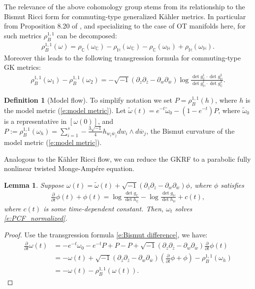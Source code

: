 \documentclass[12pt]{amsart}
\numberwithin{equation}{section}
\newtheorem{lemma}[prop]{Lemma}
\numberwithin{prop}{section}
\theoremstyle{definition}
\newtheorem{defn}[prop]{Definition}
\newcommand{\til}[1]{\widetilde{#1}}
\renewcommand{\bar}[1]{\overline{#1}}
\begin{document}
The relevance of the above cohomology group stems from its relationship to the Bismut Ricci form for commuting-type generalized K\"ahler metrics.  In particular from Proposition 8.20 of \cite{GRFbook}, and specializing to the case of OT manifolds here, for such metrics $\rho_B^{1,1}$ can be decomposed: 
\begin{align}\label{e:bismut ricci 1,1 decomposition}
    \rho_B^{1,1}(\omega) = \rho_\mathbb{C}(\omega_\mathbb{C}) - \rho_\mathbb{H}(\omega_\mathbb{C})-\rho_\mathbb{C}(\omega_\mathbb{H})+\rho_\mathbb{H}(\omega_\mathbb{H}).
\end{align}
Moreover this leads to the following transgression formula for commuting-type GK metrics:
\begin{align}\label{e:Bismut difference}
    \rho_B^{1,1}(\omega_1)-\rho_B^{1,1}(\omega_2) = -\sqrt{-1}(\partial_z\partial_{\bar{z}} - \partial_w\partial_{\bar{w}})\log\frac{\det g^1_\mathbb{C}\cdot\det g^2_\mathbb{H}}{\det g^1_\mathbb{H}\cdot\det g^2_\mathbb{C}}.
\end{align}

\begin{defn}[Model flow] To simplify notation we set $P = \rho_B^{1,1}(h)$, where $h$ is the model metric (\ref{e:model metric}).  Let $\til{\omega}(t)=e^{-t}\til{\omega}_0 -(1-e^{-t})P$, where $\til{\omega}_0$ is a representative in $[\omega(0)]$, and $P:=\rho_B^{1,1}(\omega_h)=\sum_{i=1}^s-\frac{3\sqrt{-1}}{4}h_{w_i\bar{w}_j}dw_i\wedge d\bar{w}_j$, the Bismut curvature of the model metric (\ref{e:model metric}).
\end{defn}
Analogous to the K\"ahler Ricci flow, we can reduce the GKRF to a parabolic fully nonlinear twisted Monge-Amp\'ere equation.
\begin{lemma} \label{l:scalar_reduction}
    Suppose $\omega(t)=\til{\omega}(t)+\sqrt{-1}(\partial_z\partial_{\bar{z}}-\partial_w\partial_{\bar{w}})\phi$, where $\phi$ satisfies
    \begin{align}\label{e:potential eq}
      \frac{\partial}{\partial t}\phi(t)+\phi(t)=\operatorname{log}\frac{\operatorname{det}g_\mathbb{C}}{\operatorname{det}h_\mathbb{C}}-\operatorname{log}\frac{\operatorname{det}g_\mathbb{H}}{\operatorname{det}h_\mathbb{H}}  + c(t),
    \end{align}
    where $c(t)$ is some time-dependent constant. Then, $\omega_t$ solves \ref{e:PCF_normalized}.
\end{lemma}
\begin{proof}
    
    
    Use the transgression formula \eqref{e:Bismut difference}, we have:
    \begin{align*}
    \frac{\partial}{\partial t}\omega(t)&=-e^{-t}\omega_0-e^{-t}P+P-P+\sqrt{-1}(\partial_z\partial_{\bar{z}}-\partial_w\partial_{\bar{w}})\frac{\partial}{\partial t}\phi(t)\\
    &=-\omega(t)+\sqrt{-1}(\partial_z\partial_{\bar{z}}-\partial_w\partial_{\bar{w}})(\frac{\partial}{\partial t}\phi+\phi)-\rho_B^{1,1}(\omega_h)\\
    &=-\omega(t)-\rho_B^{1,1}(\omega(t)).
  \end{align*}
\end{proof}
\end{document}

